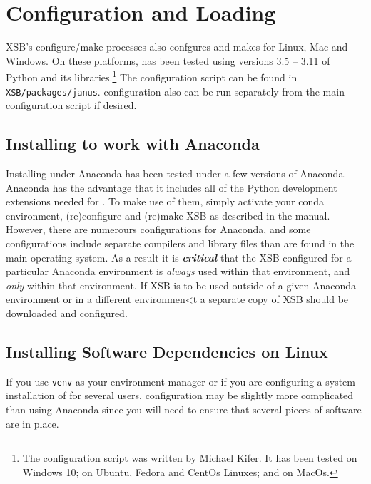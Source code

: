 \section{Configuration and Loading}

XSB's configure/make processes also confgures and makes \janus{} for
Linux, Mac and Windows.  On these platforms, \janusplg{} has been
tested using versions 3.5 -- 3.11 of Python and its
libraries.\footnote{The \janusplg{} configuration script was written
by Michael Kifer.  It has been tested on Windows 10; on Ubuntu, Fedora
and CentOs Linuxes; and on MacOs.}  The \janusplg configuration script
can be found in {\tt XSB/packages/janus}.  \janusplg configuration
also can be run separately from the main configuration script if
desired.

\subsection{Installing \janusplg{} to work with Anaconda}

Installing \janusplg under Anaconda has been tested under a few
versions of Anaconda.  Anaconda has the advantage that it includes all
of the Python development extensions needed for \janusplg.  To make
use of them, simply activate your conda environment, (re)configure and
(re)make XSB as described in the manual.  However, there are numerours
configurations for Anaconda, and some configurations include separate
compilers and library files than are found in the main operating
system.  As a result it is {\em {\bf critical}} that the XSB
configured for a particular Anaconda environment is {\em always} used
within that environment, and {\em only} within that environment.  If
XSB is to be used outside of a given Anaconda environment or in a
different environmen<t a separate copy of XSB should be downloaded and
configured.

\subsection{Installing Software Dependencies on Linux}\label{sec:janus-linux}

If you use {\tt venv} as your environment manager or if you are
configuring a system installation of \janusplg{} for several users,
configuration may be slightly more complicated than using Anaconda
since you will need to ensure that several pieces of software are in
place.


